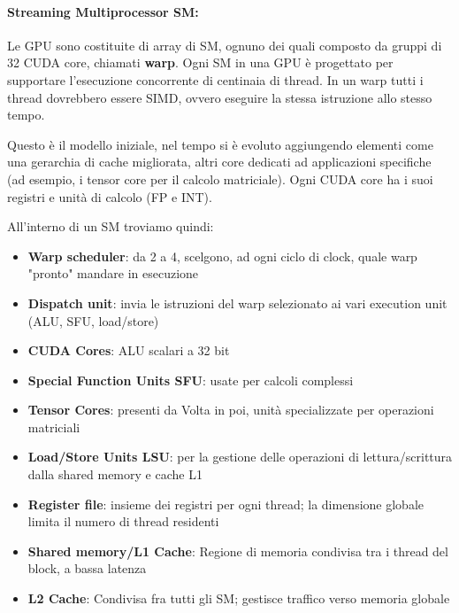 \paragraph{Streaming Multiprocessor SM:} Le GPU sono costituite di array di SM, ognuno dei quali composto da gruppi di 32 CUDA core, chiamati \textbf{warp}. Ogni SM in una GPU è progettato per supportare l'esecuzione concorrente di centinaia di thread. In un warp tutti i thread dovrebbero essere SIMD, ovvero eseguire la stessa istruzione allo stesso tempo.

Questo è il modello iniziale, nel tempo si è evoluto aggiungendo elementi come una gerarchia di cache migliorata, altri core dedicati ad applicazioni specifiche (ad esempio, i tensor core per il calcolo matriciale). Ogni CUDA core ha i suoi registri e unità di calcolo (FP e INT).

All'interno di un SM troviamo quindi:
\begin{itemize}
	\item \textbf{Warp scheduler}: da 2 a 4, scelgono, ad ogni ciclo di clock, quale warp "pronto" mandare in esecuzione

	\item \textbf{Dispatch unit}: invia le istruzioni del warp selezionato ai vari execution unit (ALU, SFU, load/store)

	\item \textbf{CUDA Cores}: ALU scalari a 32 bit

	\item \textbf{Special Function Units SFU}: usate per calcoli complessi

	\item \textbf{Tensor Cores}: presenti da Volta in poi, unità specializzate per operazioni matriciali

	\item \textbf{Load/Store Units LSU}: per la gestione delle operazioni di lettura/scrittura dalla shared memory e cache L1
	
	\item \textbf{Register file}: insieme dei registri per ogni thread; la dimensione globale limita il numero di thread residenti
	
	\item \textbf{Shared memory/L1 Cache}: Regione di memoria condivisa tra i thread del block, a bassa latenza
	
	\item \textbf{L2 Cache}: Condivisa fra tutti gli SM; gestisce traffico verso memoria globale
\end{itemize}

